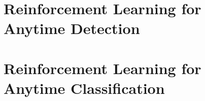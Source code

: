 
\setcounter{tocdepth}{5}
\setcounter{secnumdepth}{5}
% 
\begin{frontmatter}
    \tableofcontents
\end{frontmatter}
\pagestyle{headings}





\chapter{Reinforcement Learning for Anytime Detection}




\chapter{Reinforcement Learning for Anytime Classification}




% 

% 


\printbibliography

